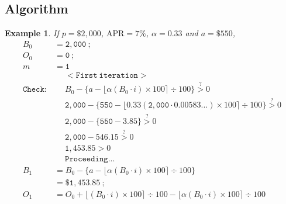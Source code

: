 \documentclass[12pt,letterpaper,oneside]{article}
\newtheorem{example}{Example}[section]
\theoremstyle{remark} %
\begin{document}
	\newpage
	\subsection{Algorithm}
	\newcommand{\rate}{0.00583...}
	\newcommand{\proportion}{0.33}
	\newcommand{\amount}{550}
	\newcommand{\balance}{2,000}
	\newcommand{\interest}{0}
	\newcommand{\months}{0}
	\newcommand{\monthsp}{1}
	\newcommand{\balanceitb}{1,453.85}
	\newcommand{\interestitb}{7.82}
	\newcommand{\monthsitb}{1}
	\newcommand{\monthspitb}{2}
	\newcommand{\balanceitc}{906.65}
	\newcommand{\interestitc}{13.50}
	\newcommand{\monthsitc}{2}
	\newcommand{\monthspitc}{3}
	\newcommand{\balanceitf}{358.40}
	\newcommand{\interestitf}{17.04}
	\newcommand{\monthsitf}{3}%
	\newcommand{\monthspitf}{4}%
	\newcommand{\amountfinal}{377.53}
	\begin{example}
	If $p=\$2,000$, $\mbox{APR}=7\%$, $\alpha=0.33$ and $a=\$550$,
	\footnotesize
	\begin{align*}
	B_{0}&=\mathtt{\balance}\ ;\\
	O_{0}&=\mathtt{\interest}\ ;\\
	m&=\mathtt{\monthsp}\\[12pt]
	&\quad\;\mathtt{<First\ iteration>}\\
	\mathtt{Check:}&\quad\;B_{\months}-\Big\{a-\big\lfloor{\alpha\left(B_{\months}\cdot i\right)\times 100}\big\rceil\div 100\Big\}\overset{?}{>}0\\[-6pt]
	&\quad\;\mathtt{\balance}-\Big\{\mathtt{\amount}-\big\lfloor{\mathtt{\proportion}\left(\mathtt{\balance}\cdot \mathtt{\rate}\right)\times 100}\big\rceil\div 100\Big\}\overset{?}{>}0\\[-6pt]
	&\quad\;\mathtt{\balance}-\Big\{\mathtt{\amount}-\mathtt{3.85}\Big\}\overset{?}{>}0\\[-6pt]
	&\quad\;\mathtt{\balance}-\mathtt{546.15}\overset{?}{>}0\\
	&\quad\;\mathtt{1,453.85}>0\\
	&\quad\;\mathtt{Proceeding...}\\[12pt]
	B_{\monthsp}&=B_{\months}-\Big\{a-\big\lfloor{\alpha\left(B_{\months}\cdot i\right)\times 100}\big\rceil\div 100\Big\}\\
	&=\mathtt{\$1,453.85}\ ;\\[12pt]
	O_{\monthsp}&=O_{\months}+\big\lfloor{\left(B_{\months}\cdot i\right)\times 100}\big\rceil\div 100-\big\lfloor{\alpha\left(B_{\months}\cdot i\right)\times 100}\big\rceil\div 100\\

\end{align*}
\end{example}
\end{document}

